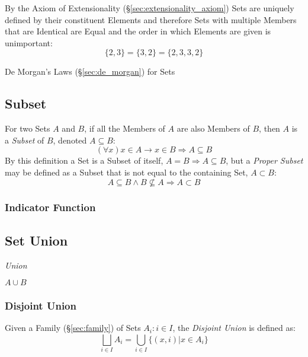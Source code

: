 By the Axiom of Extensionality (\S\ref{sec:extensionality_axiom}) Sets
are uniquely defined by their constituent Elements and therefore Sets
with multiple Members that are Identical are Equal and the order in
which Elements are given is unimportant:
\[
  \{ 2, 3 \} = \{ 3, 2 \} = \{ 2, 3, 3, 2 \}
\]

De Morgan's Laws (\S\ref{sec:de_morgan}) for Sets



\subsection{Subset}\label{sec:subset}

For two Sets $A$ and $B$, if all the Members of $A$ are also Members
of $B$, then $A$ is a \emph{Subset} of $B$, denoted $A \subseteq B$:
\[
  (\forall x) x \in A \rightarrow x \in B \Rightarrow A \subseteq B
\]
By this definition a Set is a Subset of itself, $A = B \Rightarrow A
\subseteq B$, but a \emph{Proper Subset} may be defined as a Subset
that is not equal to the containing Set, $A \subset B$:
\[
  A \subseteq B \wedge B \nsubseteq A \Rightarrow A \subset B
\]



\subsubsection{Indicator Function}\label{sec:indicator_function}



\subsection{Set Union}\label{sec:set_union}

\emph{Union}

$A \cup B$



\subsubsection{Disjoint Union}\label{sec:disjoint_union}

Given a Family (\S\ref{sec:family}) of Sets ${A_i : i \in I}$,
the \emph{Disjoint Union} is defined as:
\[
  \bigsqcup_{i \in I} A_i = \bigcup_{i \in I} \{(x,i) | x \in A_i \}
\]

